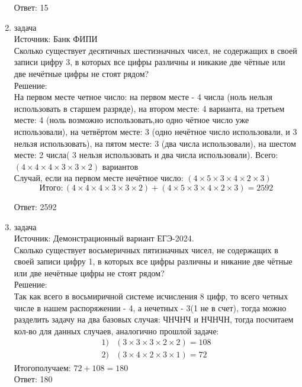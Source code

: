 \documentclass[a4paper,14pt]{extreport} %
\begin{document}
\begin{center}
\begin{enumerate}
						 Ответ: 15
						 
						 \item {\large задача  }\\
						 Источник: Банк ФИПИ\\
						 \vspace{15pt}
						 Сколько существует десятичных шестизначных чисел, не содержащих в своей записи цифру 3, в которых все цифры различны и никакие две чётные или две нечётные цифры не стоят рядом?
						 \\
						 \vspace{15pt}
						 Решение:\\
						 На первом месте четное число:  на первом месте - 4 числа (ноль нельзя использовать в старшем разряде), на втором месте: 4 варианта, на третьем месте: 4 (ноль возможно использовать,но одно чётное число уже использовали), на четвёртом месте: 3 (одно нечётное число использовали, и 3 нельзя использовать), на пятом месте: 3 (два числа использовали), на шестом месте: 2 числа( 3 нельзя использовать и два числа использовали). Всего: $(4\times4\times4\times3\times3\times2)$ вариантов\\
						 Случай, если на первом месте нечётное число: $(4\times5\times3\times4\times2\times3)$
						 \begin{equation}
						 	Итого: (4\times4\times4\times3\times3\times2) + (4\times5\times3\times4\times2\times3) = 2592
						 \end{equation}
						 
						 Ответ: 2592
						 
						 
						  \item {\large задача  }\\
						 Источник: Демонстрационный вариант ЕГЭ-2024.\\
						 \vspace{15pt}
						 Сколько существует восьмеричных пятизначных чисел, не содержащих в своей записи цифру 1, в которых все цифры различны и никание две чётные или две нечётные цифры не стоят рядом?
						 \\
						 \vspace{15pt}
						 Решение:\\
						 Так как всего в восьмиричной системе исчисления 8 цифр, то всего четных числе в нашем распоряжении - 4, а нечетных - 3(1 не в счет), тогда можно разделить задачу на два базовых случая: ЧНЧНЧ и НЧНЧН, тогда посчитаем кол-во для данных случаев, аналогично прошлой задаче:
						 \begin{align}
						 	1)& (3\times3\times3\times2\times2) = 108 \\
						 	2)& (3\times4\times2\times3\times1) = 72 
						 \end{align}
						 Итого\space получаем: $72 + 108 = 180$\\
						 Ответ: 180
						 

\end{enumerate}
\end{center}
\end{document}
